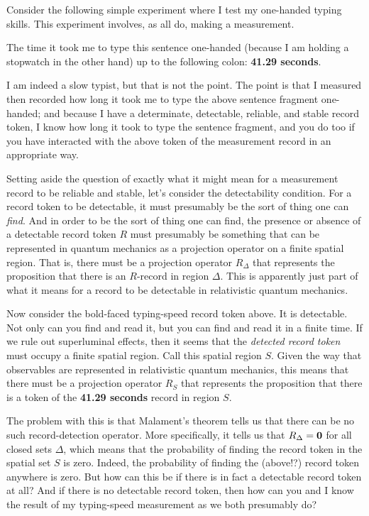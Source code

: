 \documentclass [12pt]{article}
\begin{document}
Consider the following simple experiment where I test my one-handed
typing skills.  This experiment involves, as all do, making a
measurement.

\vspace{.5in}
\noindent
The time it took me to type this sentence one-handed (because I am holding
a stopwatch in the other hand) up to the following colon: {\bf 41.29 seconds}.

\vspace{.5in}
\noindent
I am indeed a slow typist, but that is not the point.  The point is that I
measured then recorded how long it took me to type the above sentence fragment
one-handed; and because I have a determinate, detectable, reliable, and stable record
token, I know how long it took to type the sentence fragment, and you do
too if you have interacted with the above token of the measurement record in an
appropriate way.

Setting aside the question of exactly what it might mean for a measurement record
to be reliable and stable, let's consider the detectability condition.  For a record
token to be detectable, it must presumably be the sort of thing one can
{\em find}.  And in order to be the sort of thing one can find, the
presence or absence of a detectable record token $R$ must presumably be something
that can be represented in quantum mechanics as a projection operator on
a finite spatial region.  That is, there must be a projection
operator $R_\Delta$ that represents the proposition that there is an $R$-record
in region $\Delta$.  This is apparently just part of
what it means for a record to be detectable in relativistic quantum mechanics.

Now consider the bold-faced typing-speed record token above.  It is detectable.
Not only can you find and read it, but you can find and read it in
a finite time.  If we rule out superluminal effects, then it seems that
the {\em detected record token\/} must occupy a finite spatial region.  Call
this spatial region $S$.  Given the way that observables are represented
in relativistic quantum mechanics, this means that
there must be a projection operator $R_S$ that represents the proposition
that there is a token of the {\bf 41.29 seconds} record in region $S$.

The problem with this is that Malament's theorem tells us that there
can be no such record-detection operator.  More specifically, it tells us that
$R_\Delta=\mbox{\bf 0}$ for all closed sets $\Delta$, which means that the
probability of finding the record token in the spatial set $S$ is zero.
 Indeed, the probability of finding the (above!?) record token anywhere is
zero.  But how can this be if there is in fact a detectable
record token at all?  And if there is no detectable record token, then how
can you and I know the result of my typing-speed measurement
as we both presumably do?
\end{document}
